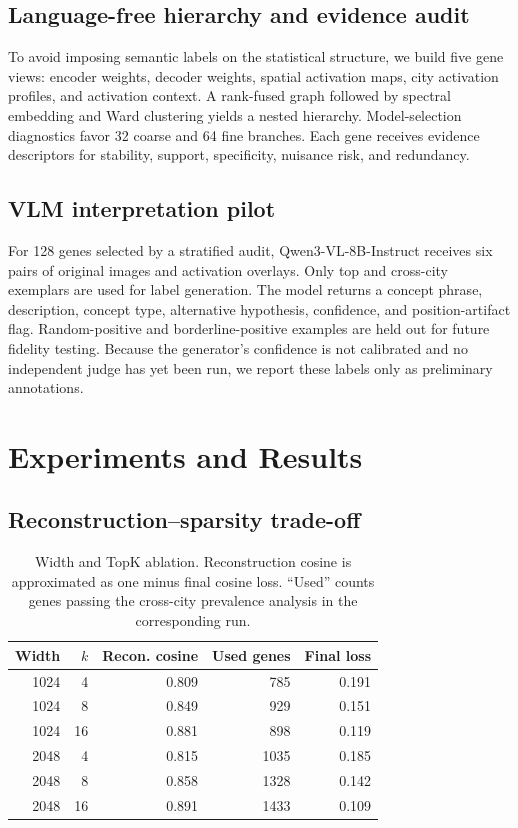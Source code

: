 \documentclass[10pt]{article}
\begin{document}
\subsection{Language-free hierarchy and evidence audit}
To avoid imposing semantic labels on the statistical structure, we build five gene
views: encoder weights, decoder weights, spatial activation maps, city activation
profiles, and activation context. A rank-fused graph followed by spectral embedding
and Ward clustering yields a nested hierarchy. Model-selection diagnostics favor 32
coarse and 64 fine branches. Each gene receives evidence descriptors for stability,
support, specificity, nuisance risk, and redundancy.

\subsection{VLM interpretation pilot}
For 128 genes selected by a stratified audit, Qwen3-VL-8B-Instruct receives six
pairs of original images and activation overlays. Only top and cross-city exemplars
are used for label generation. The model returns a concept phrase, description,
concept type, alternative hypothesis, confidence, and position-artifact flag.
Random-positive and borderline-positive examples are held out for future fidelity
testing. Because the generator's confidence is not calibrated and no independent
judge has yet been run, we report these labels only as preliminary annotations.

\section{Experiments and Results}
\subsection{Reconstruction--sparsity trade-off}
\begin{table}[t]
\centering
\caption{Width and TopK ablation. Reconstruction cosine is approximated as one
minus final cosine loss. ``Used'' counts genes passing the cross-city prevalence
analysis in the corresponding run.}
\label{tab:ablation}
\begin{tabular}{rrrrr}
\toprule
Width & $k$ & Recon. cosine & Used genes & Final loss\\
\midrule
1024 & 4  & 0.809 & 785  & 0.191\\
1024 & 8  & 0.849 & 929  & 0.151\\
1024 & 16 & 0.881 & 898  & 0.119\\
2048 & 4  & 0.815 & 1035 & 0.185\\
2048 & 8  & 0.858 & 1328 & 0.142\\
2048 & 16 & 0.891 & 1433 & 0.109\\
\bottomrule
\end{tabular}
\end{table}
\end{document}
